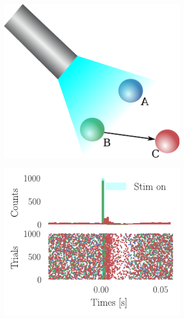 \documentclass[11pt]{article}
\begin{document}
\begin{figure} 
\makeatletter
\renewcommand\p@subfigure{}
\makeatother
\begin{subfigure}{0.485\textwidth} \includegraphics[scale=1]{simple}
\caption{} \label{fig:intro:1}
\end{subfigure}\hfill
\begin{subfigure}{0.485\textwidth} \includegraphics[scale=1]{raster}
\caption{} \label{fig:intro:2}
\end{subfigure}


\end{figure}
\end{document}
